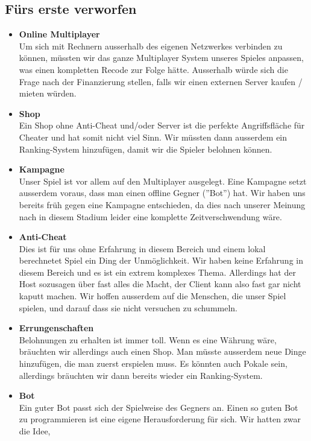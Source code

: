 \subsection{Fürs erste verworfen}
\begin{itemize}
    \item \textbf{Online Multiplayer} \\
        Um sich mit Rechnern ausserhalb des eigenen Netzwerkes verbinden zu können, müssten wir das ganze Multiplayer System unseres Spieles anpassen, was einen kompletten Recode zur Folge hätte. 
        Ausserhalb würde sich die Frage nach der Finanzierung stellen, falls wir einen externen Server kaufen / mieten würden. 
    \item \textbf{Shop} \\
        Ein Shop ohne Anti-Cheat und/oder Server ist die perfekte Angriffsfläche für Cheater und hat somit nicht viel Sinn. Wir müssten dann ausserdem ein Ranking-System
        hinzufügen, damit wir die Spieler belohnen können.
    \item \textbf{Kampagne} \\
        Unser Spiel ist vor allem auf den Multiplayer ausgelegt. Eine Kampagne setzt ausserdem voraus, dass man einen offline Gegner (''Bot'') hat. Wir haben uns bereits 
        früh gegen eine Kampagne entschieden, da dies nach unserer Meinung nach in diesem Stadium leider eine komplette Zeitverschwendung wäre.
    \item \textbf{Anti-Cheat} \\
        Dies ist für uns ohne Erfahrung in diesem Bereich und einem lokal berechnetet Spiel ein Ding der Unmöglichkeit.
        Wir haben keine Erfahrung in diesem Bereich und es ist ein extrem komplexes Thema. Allerdings hat der Host sozusagen über fast alles die Macht, der Client kann also fast
        gar nicht kaputt machen. Wir hoffen ausserdem auf die Menschen, die unser Spiel spielen, und darauf dass sie nicht versuchen zu schummeln.
    \item \textbf{Errungenschaften} \\
        Belohnungen zu erhalten ist immer toll. Wenn es eine Währung wäre, bräuchten wir allerdings auch einen Shop. Man müsste ausserdem neue Dinge hinzufügen,
        die man zuerst erspielen muss. Es könnten auch Pokale sein, allerdings bräuchten wir dann bereits wieder ein Ranking-System.
    \item \textbf{Bot} \\
        Ein guter Bot passt sich der Spielweise des Gegners an. Einen so guten Bot zu programmieren ist eine eigene Herausforderung für sich. Wir hatten zwar die Idee,

\end{itemize}
